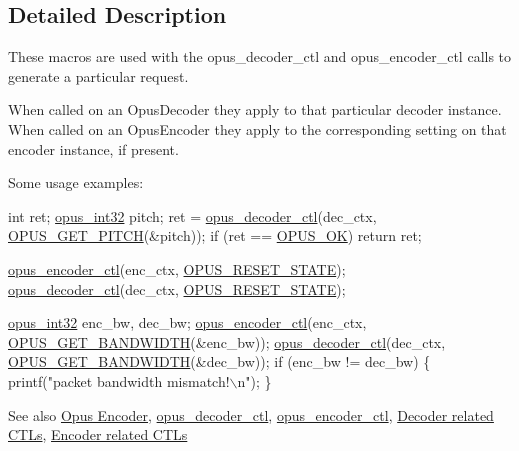 \subsection{Detailed Description}
These macros are used with the {\ttfamily opus\+\_\+decoder\+\_\+ctl} and {\ttfamily opus\+\_\+encoder\+\_\+ctl} calls to generate a particular request. 

When called on an {\ttfamily Opus\+Decoder} they apply to that particular decoder instance. When called on an {\ttfamily Opus\+Encoder} they apply to the corresponding setting on that encoder instance, if present.

Some usage examples\+:


\begin{DoxyCode}
\textcolor{keywordtype}{int} ret;
\hyperlink{opus__types_8h_aa4d309d6f80b99dbabebc8f98879ab9a}{opus\_int32} pitch;
ret = \hyperlink{group__opus__decoder_ga2d492844b4f66e7f34d85870f13d4846}{opus\_decoder\_ctl}(dec\_ctx, \hyperlink{group__opus__decoderctls_gaa89fc25eb35fc31a02b508562dd83820}{OPUS\_GET\_PITCH}(&pitch));
\textcolor{keywordflow}{if} (ret == \hyperlink{group__opus__errorcodes_gaa44cf8a185e1b5cb940ef63eb4f02d21}{OPUS\_OK}) \textcolor{keywordflow}{return} ret;

\hyperlink{group__opus__encoder_ga164cbb0425238961919adf1db67949df}{opus\_encoder\_ctl}(enc\_ctx, \hyperlink{group__opus__genericctls_gadc74e4fa8bcdf9994187d52d92207337}{OPUS\_RESET\_STATE});
\hyperlink{group__opus__decoder_ga2d492844b4f66e7f34d85870f13d4846}{opus\_decoder\_ctl}(dec\_ctx, \hyperlink{group__opus__genericctls_gadc74e4fa8bcdf9994187d52d92207337}{OPUS\_RESET\_STATE});

\hyperlink{opus__types_8h_aa4d309d6f80b99dbabebc8f98879ab9a}{opus\_int32} enc\_bw, dec\_bw;
\hyperlink{group__opus__encoder_ga164cbb0425238961919adf1db67949df}{opus\_encoder\_ctl}(enc\_ctx, \hyperlink{group__opus__genericctls_ga29db1d9b5e670debec54d1163ad2ec62}{OPUS\_GET\_BANDWIDTH}(&enc\_bw));
\hyperlink{group__opus__decoder_ga2d492844b4f66e7f34d85870f13d4846}{opus\_decoder\_ctl}(dec\_ctx, \hyperlink{group__opus__genericctls_ga29db1d9b5e670debec54d1163ad2ec62}{OPUS\_GET\_BANDWIDTH}(&dec\_bw));
\textcolor{keywordflow}{if} (enc\_bw != dec\_bw) \{
  printf(\textcolor{stringliteral}{"packet bandwidth mismatch!\(\backslash\)n"});
\}
\end{DoxyCode}


\begin{DoxySeeAlso}{See also}
\hyperlink{group__opus__encoder}{Opus Encoder}, \hyperlink{group__opus__decoder_ga2d492844b4f66e7f34d85870f13d4846}{opus\+\_\+decoder\+\_\+ctl}, \hyperlink{group__opus__encoder_ga164cbb0425238961919adf1db67949df}{opus\+\_\+encoder\+\_\+ctl}, \hyperlink{group__opus__decoderctls}{Decoder related C\+T\+Ls}, \hyperlink{group__opus__encoderctls}{Encoder related C\+T\+Ls} 
\end{DoxySeeAlso}


